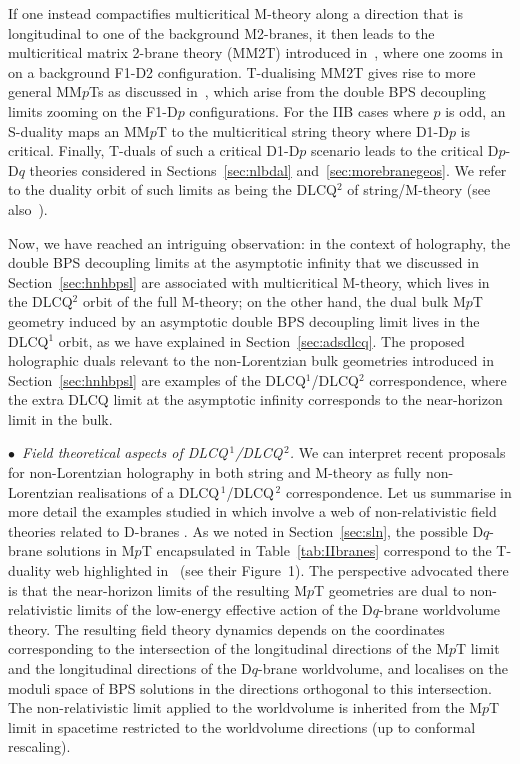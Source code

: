 \documentclass[11pt]{article}
\renewcommand{\emph}[1]{\textit{#1}}
\begin{document}
If one instead compactifies multicritical M-theory along a direction that is longitudinal to one of the background M2-branes, it then leads to the multicritical matrix 2-brane theory (MM2T) introduced in~\cite{Blair:2023noj,Gomis:2023eav}, where one zooms in on a background F1-D2 configuration. T-dualising MM2T gives rise to more general MM$p$Ts as discussed in~\cite{Blair:2023noj,Gomis:2023eav}, which arise from the double BPS decoupling limits zooming on the F1-D$p$ configurations. For the IIB cases where $p$ is odd, an S-duality maps an MM$p$T to the multicritical string theory where D1-D$p$ is critical. Finally, T-duals of such a critical D1-D$p$ scenario leads to the critical D$p$-D$q$ theories considered in Sections~\ref{sec:nlbdal} and~\ref{sec:morebranegeos}. We refer to the duality orbit of such limits as being the DLCQ${}^2$ of string/M-theory (see also~\cite{bpslimits}).

Now, we have reached an intriguing observation: in the context of holography, the double BPS decoupling limits at the asymptotic infinity that we discussed in Section~\ref{sec:hnhbpsl} are associated with multicritical M-theory, which lives in the DLCQ${}^2$ orbit of the full M-theory; on the other hand, the dual bulk M$p$T geometry induced by an asymptotic double BPS decoupling limit lives in the DLCQ${}^1$ orbit, as we have explained in Section~\ref{sec:adsdlcq}. The proposed holographic duals relevant to the non-Lorentzian bulk geometries introduced in Section~\ref{sec:hnhbpsl} are examples of the DLCQ${}^1$/DLCQ${}^2$ correspondence, where the extra DLCQ limit at the asymptotic infinity corresponds to the near-horizon limit in the bulk. 

\vspace{3mm}

\noindent $\bullet$~\emph{Field theoretical aspects of DLCQ${}^{\,1}$/DLCQ${}^{\,2}$.} 
We can interpret recent proposals for non-Lorentzian holography in both string and M-theory \cite{Lambert:2024uue, Fontanella:2024rvn, Lambert:2024yjk, Fontanella:2024kyl} as fully non-Lorentzian realisations of a DLCQ${}^{\,1}$/DLCQ${}^{\,2}$ correspondence.
Let us summarise in more detail the examples studied in \cite{Lambert:2024yjk} which involve a web of non-relativistic field theories related to D-branes \cite{Lambert:2018lgt,Lambert:2019nti}. As we noted in Section~\ref{sec:sln}, the possible D$q$-brane solutions in M$p$T encapsulated in Table~\ref{tab:IIbranes} correspond to the T-duality web highlighted in~\cite{Lambert:2024yjk} (see their Figure~1).
The perspective advocated there is that the near-horizon limits of the resulting M$p$T geometries are dual to non-relativistic limits of the low-energy effective action of the D$q$-brane worldvolume theory.
The resulting field theory dynamics depends on the coordinates corresponding to the intersection of the longitudinal directions of the M$p$T limit and the longitudinal directions of the D$q$-brane worldvolume, and localises on the moduli space of BPS solutions in the directions orthogonal to this intersection. The non-relativistic limit applied to the worldvolume is inherited from the M$p$T limit in spacetime restricted to the worldvolume directions (up to conformal rescaling).
\end{document}
